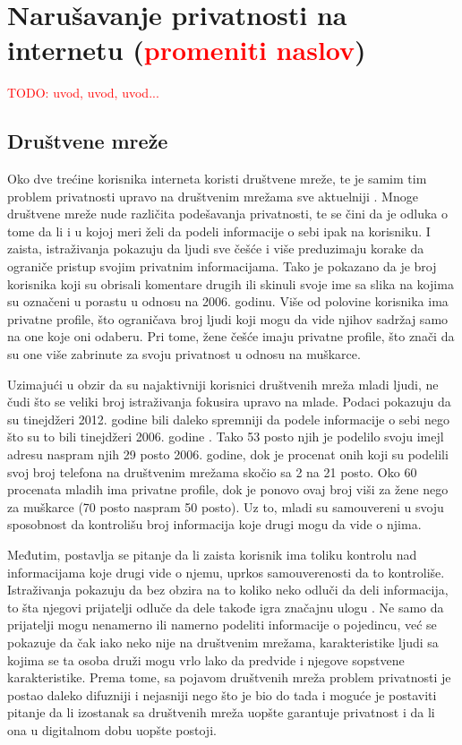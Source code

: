 \documentclass[a4paper]{article}
\newcommand\todos[1]{\textcolor{red}{#1}}
\begin{document}
\section{Narušavanje privatnosti na internetu (\todos{promeniti naslov})}
\label{sec:trecePoglavlje}
\todos{TODO: uvod, uvod, uvod...}
\\
\subsection{Društvene mreže}
Oko dve trećine korisnika interneta koristi društvene mreže, te je samim tim problem privatnosti upravo na društvenim mrežama sve aktuelniji \cite{sm1}. Mnoge društvene mreže nude različita podešavanja privatnosti, te se čini da je odluka o tome da li i u kojoj meri želi da podeli informacije o sebi ipak na korisniku. I zaista, istraživanja pokazuju da ljudi sve češće i više preduzimaju korake da ograniče pristup svojim privatnim informacijama. Tako je pokazano da je broj korisnika koji su obrisali komentare drugih ili skinuli svoje ime sa slika na kojima su označeni u porastu u odnosu na 2006. godinu. Više od polovine korisnika ima privatne profile, što ograničava broj ljudi koji mogu da vide njihov sadržaj samo na one koje oni odaberu. Pri tome, žene češće imaju privatne profile, što znači da su one više zabrinute za svoju privatnost u odnosu na muškarce.
\par Uzimajući u obzir da su najaktivniji korisnici društvenih mreža mladi ljudi, ne čudi što se veliki broj istraživanja fokusira upravo na mlade. Podaci pokazuju da su tinejdžeri 2012. godine bili daleko spremniji da podele informacije o sebi nego što su to bili tinejdžeri 2006. godine \cite{sm2}. Tako 53 posto njih je podelilo svoju imejl adresu naspram njih 29 posto 2006. godine, dok je procenat onih koji su podelili svoj broj telefona na društvenim mrežama skočio sa 2 na 21 posto. Oko 60 procenata mladih ima privatne profile, dok je ponovo ovaj broj viši za žene nego za muškarce (70 posto naspram 50 posto). Uz to, mladi su samouvereni u svoju sposobnost da kontrolišu broj informacija koje drugi mogu da vide o njima.
\par Međutim, postavlja se pitanje da li zaista korisnik ima toliku kontrolu nad informacijama koje drugi vide o njemu, uprkos samouverenosti da to kontroliše. Istraživanja pokazuju da bez obzira na to koliko neko odluči da deli informacija, to šta njegovi prijatelji odluče da dele takođe igra značajnu ulogu \cite{sm3}. Ne samo da prijatelji mogu nenamerno ili namerno podeliti informacije o pojedincu, već se pokazuje da čak iako neko nije na društvenim mrežama, karakteristike ljudi sa kojima se ta osoba druži mogu vrlo lako da predvide i njegove sopstvene karakteristike. Prema tome, sa pojavom društvenih mreža problem privatnosti je postao daleko difuzniji i nejasniji nego što je bio do tada i moguće je postaviti pitanje da li izostanak sa društvenih mreža uopšte garantuje privatnost i da li ona u digitalnom dobu uopšte postoji.
\end{document}
